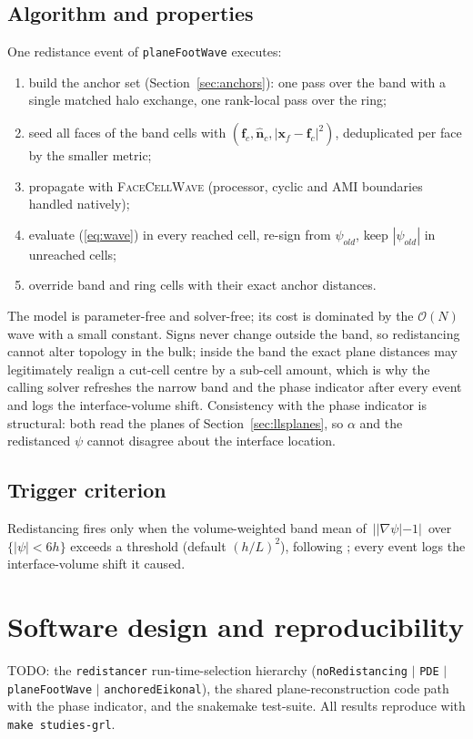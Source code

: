 \documentclass[preprint,3p,11pt]{elsarticle}
\newcommand{\psilev}{\psi}
\newcommand{\nhat}{\hat{\mathbf{n}}}
\newcommand{\gradpsi}{\nabla\psilev}
\begin{document}
\subsection{Algorithm and properties}
\label{sec:algorithm}
One redistance event of \texttt{planeFootWave} executes:
\begin{enumerate}
  \item build the anchor set (Section~\ref{sec:anchors}): one pass over the
    band with a single matched halo exchange, one rank-local pass over the
    ring;
  \item seed all faces of the band cells with $(\mathbf{f}_c,\nhat_c,
    |\mathbf{x}_f-\mathbf{f}_c|^2)$, deduplicated per face by the smaller
    metric;
  \item propagate with \textsc{FaceCellWave} (processor, cyclic and AMI
    boundaries handled natively);
  \item evaluate (\ref{eq:wave}) in every reached cell, re-sign from
    $\psilev_{old}$, keep $|\psilev_{old}|$ in unreached cells;
  \item override band and ring cells with their exact anchor distances.
\end{enumerate}
The model is parameter-free and solver-free; its cost is dominated by the
$\mathcal{O}(N)$ wave with a small constant. Signs never change outside the
band, so redistancing cannot alter topology in the bulk; inside the band the
exact plane distances may legitimately realign a cut-cell centre by a
sub-cell amount, which is why the calling solver refreshes the narrow band
and the phase indicator after every event and logs the interface-volume
shift. Consistency with the phase indicator is structural: both read the
planes of Section~\ref{sec:llsplanes}, so $\alpha$ and the redistanced
$\psilev$ cannot disagree about the interface location.

\subsection{Trigger criterion}
Redistancing fires only when the volume-weighted band mean of
$\,||\gradpsi|-1|\,$ over $\{|\psilev| < 6h\}$ exceeds a threshold
(default $(h/L)^2$), following \cite{abualsaud2018}; every event logs the
interface-volume shift it caused.

\section{Software design and reproducibility}
\label{sec:software}
TODO: the \texttt{redistancer} run-time-selection hierarchy
(\texttt{noRedistancing} $|$ \texttt{PDE} $|$ \texttt{planeFootWave} $|$
\texttt{anchoredEikonal}), the shared plane-reconstruction code path with the
phase indicator, and the snakemake test-suite. All results reproduce with
\texttt{make studies-grl}.
\end{document}
